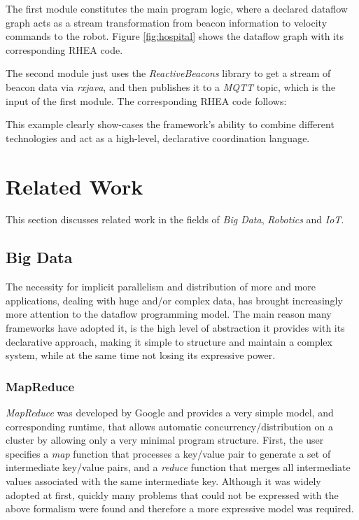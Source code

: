 \documentclass[sigplan,review,anonymous]{acmart}\settopmatter{printfolios=true,printacmref=false}
\begin{document}
The first module constitutes the main program logic, where a declared dataflow graph acts as a stream transformation from beacon information to velocity commands to the robot. Figure \ref{fig:hospital} shows the dataflow graph with its corresponding \textsc{RHEA} code.


The second module just uses the \textit{ReactiveBeacons} library to get a stream of beacon data via \textit{rxjava}, and then publishes it to a \textit{MQTT} topic, which is the input of the first module. The corresponding \textsc{RHEA} code follows:

This example clearly show-cases the framework's ability to combine different technologies and act as a high-level, declarative coordination language.



\section{Related Work} \label{sec:related}

This section discusses related work in the fields of \textit{Big Data}, \textit{Robotics} and \textit{IoT}.

\subsection{Big Data}

The necessity for implicit parallelism and distribution of more and more applications, dealing with huge and/or complex data, has brought increasingly more attention to the dataflow programming model. The main reason many frameworks have adopted it, is the high level of abstraction it provides with its declarative approach, making it simple to structure and maintain a complex system, while at the same time not losing its expressive power.

\subsubsection{MapReduce}

\textit{MapReduce} was developed by Google and provides a very simple model, and corresponding runtime, that allows automatic concurrency/distribution on a cluster by allowing only a very minimal program structure. First, the user specifies a \textit{map} function that processes a key/value pair to generate a set of intermediate key/value pairs, and a \textit{reduce} function that merges all intermediate values associated with the same intermediate key. Although it was widely adopted at first, quickly many problems that could not be expressed with the above formalism were found and therefore a more expressive model was required.
\end{document}
